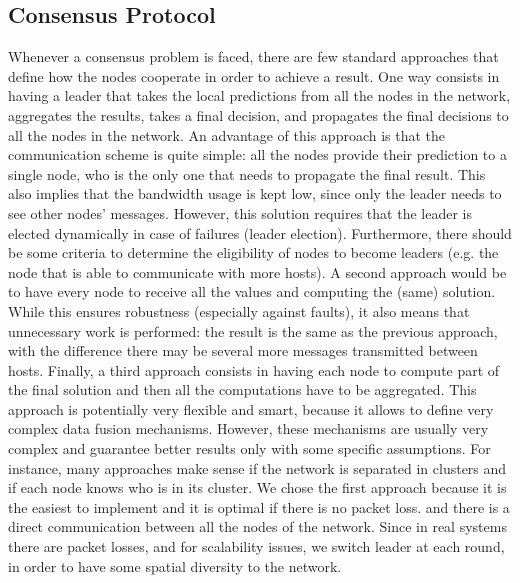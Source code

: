 \documentclass[10pt,conference,compsocconf]{IEEEtran}
\begin{document}
\subsection{Consensus Protocol}
Whenever a consensus problem is faced, there are few standard approaches that define how the nodes cooperate in order to achieve a result. One way consists in having a leader that takes the local predictions from all the nodes in the network, aggregates the results, takes a final decision, and propagates the final decisions to all the nodes in the network. An advantage of this approach is that the communication scheme is quite simple: all the nodes provide their prediction to a single node, who is the only one that needs to propagate the final result. This also implies that the bandwidth usage is kept low, since only the leader needs to see other nodes' messages. However, this solution requires that the leader is elected dynamically in case of failures (leader election). Furthermore, there should be some criteria to determine the eligibility of nodes to become leaders (e.g. the node that is able to communicate with more hosts). A second approach would be to have every node to receive all the values and computing the (same) solution. While this ensures robustness (especially against faults), it also means that unnecessary work is performed: the result is the same as the previous approach, with the difference there may be several more messages transmitted between hosts. Finally, a third approach consists in having each node to compute part of the final solution and then all the computations have to be aggregated. This approach is potentially very flexible and smart, because it allows to define very complex data fusion mechanisms.
However, these mechanisms are usually very complex and guarantee better results only with some specific assumptions.
For instance, many approaches make sense if the network is separated in clusters and if each node knows who is in its cluster.
We chose the first approach because it is the easiest to implement and it is optimal if there is no packet loss. and there is a direct communication between all the nodes of the network. Since in real systems there are packet losses, and for scalability issues, we switch leader at each round, in order to have some spatial diversity to the network.
\end{document}

